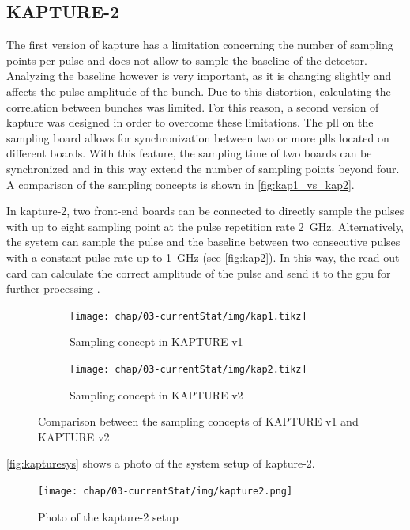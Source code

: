 \subsection{KAPTURE-2}
The first version of \gls{kapture} has a limitation concerning the number of sampling points per pulse and does not allow to sample the baseline of the detector.
Analyzing the baseline however is very important, as it is changing slightly and affects the pulse amplitude of the bunch. 
Due to this distortion, calculating the correlation between bunches was limited. 
For this reason, a second version of \gls{kapture} was designed in order to overcome these limitations. 
The \gls{pll} on the sampling board allows for synchronization between two or more \glspl{pll} located on different boards.
With this feature, the sampling time of two boards can be synchronized and in this way extend the number of sampling points beyond four.
A comparison of the sampling concepts is shown in \autoref{fig:kap1_vs_kap2}.

In \gls{kapture}-2, two front-end boards can be connected to directly sample the pulses with up to eight sampling point at the pulse repetition rate \SI{2}{\GHz}. 
Alternatively, the system can sample the pulse and the baseline between two consecutive pulses with a constant pulse rate up to \SI{1}{\GHz} (see \autoref{fig:kap2}).
In this way, the read-out card can calculate the correct amplitude of the pulse and send it to the \gls{gpu} for further processing \cite{caselleKAP}.


\begin{figure}[tbh]
	\centering
	\begin{subfigure}{0.4\textwidth}
		\centering
		\texttt{[image: chap/03-currentStat/img/kap1.tikz]}  
		\caption{Sampling concept in KAPTURE v1}
		\label{fig:kap1}
	\end{subfigure}
	\hfill
	\begin{subfigure}{0.4\textwidth}
		\centering
		\texttt{[image: chap/03-currentStat/img/kap2.tikz]}  
		\caption{Sampling concept in KAPTURE v2}
		\label{fig:kap2}
	\end{subfigure}
	\caption[Comparison between KAPTURE v1 and v2]{Comparison between the sampling concepts of KAPTURE v1 and KAPTURE v2}
	\label{fig:kap1_vs_kap2}
\end{figure}


\autoref{fig:kapturesys} shows a photo of the system setup of \gls{kapture}-2.

\begin{figure}[tbh]
	\centering
	\texttt{[image: chap/03-currentStat/img/kapture2.png]}
	\caption[Photo of KAPTURE-2 system]{Photo of the \gls{kapture}-2 setup}
	\label{fig:kapturesys}
\end{figure}



